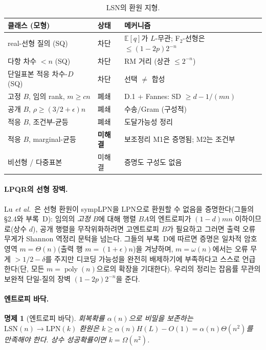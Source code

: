 \documentclass[11pt,a4paper]{article}
\theoremstyle{plain}
\newtheorem{proposition}[theorem]{명제}
\theoremstyle{definition}
\newcommand{\E}{\mathbb{E}}
\newcommand{\etal}{\textit{et al.}}
\begin{document}
\begin{table}[ht]
\centering
\caption{LSN의 환원 지형.}
\begin{tabular}{@{}>{\raggedright\arraybackslash}p{5.2cm}l>{\raggedright\arraybackslash}p{6.2cm}@{}}
\hline
클래스 (모형) & 상태 & 메커니즘 \\
\hline
real-선형 질의 (SQ) & 차단 & $\E[q]$가 $L$-무관; F$_2$-선형은 $\le (1-2p)2^{-n}$ \\
다항 차수 $<n$ (SQ) & 차단 & RM 거리 (상관 $\le 2^{-n}$) \\
단일표본 적응 차수-$D$ (SQ) & 차단 & 선택 $\neq$ 합성 \\
고정 $B$, 임의 rank, $m \ge cn$ & 폐쇄 & D.1 + Fannes: SD $\ge d - 1/(mn)$ \\
공개 $B$, $\rho \ge (3/2+\epsilon)n$ & 폐쇄 & 수송/Gram (구성적) \\
적응 $B$, 조건부-균등 & 폐쇄 & 도달가능성 정리 \\
적응 $B$, marginal-균등 & \textbf{미해결} & 보조정리 M1은 증명됨; M2는 조건부 \\
비선형 / 다중표본 & 미해결 & 증명도 구성도 없음 \\
\hline
\end{tabular}
\end{table}

\paragraph{LPQR의 선형 장벽.} Lu \etal~\cite{LPQR26}은 선형 환원이 sympLPN을 LPN으로 환원할 수 없음을 증명한다(그들의 \S2.4와 부록~D): 임의의 \emph{고정} $B$에 대해 행렬 $BA$의 엔트로피가 $(1-d)mn$ 이하이므로(상수 $d$), 공개 행렬을 무작위화하려면 고엔트로피 $B$가 필요하고 그러면 출력 오류 무게가 Shannon 역정리 문턱을 넘는다. 그들의 부록~D에 따르면 증명은 일차적 암호 영역 $m=\Theta(n)$(출력 행 $m=(1+\epsilon)n$)을 겨냥하며, $m=\omega(n)$에서는 오류 무게 $>1/2-\delta$를 주지만 디코딩 가능성을 완전히 배제하기에 부족하다고 스스로 언급한다(단, 모든 $m=\operatorname{poly}(n)$으로의 확장을 기대한다). 우리의 정리는 잡음률 무관의 보완적 단일-질의 장벽 $(1-2p)2^{-n}$을 준다.

\paragraph{엔트로피 바닥.}
\begin{proposition}[엔트로피 바닥]
회복확률 $\alpha(n)$으로 비밀을 보존하는 $\mathrm{LSN}(n) \to \mathrm{LPN}(k)$ 환원은 $k \ge \alpha(n)H(L) - O(1) = \alpha(n)\Theta(n^2)$를 만족해야 한다. 상수 성공확률이면 $k = \Omega(n^2)$.
\end{proposition}
\end{document}

